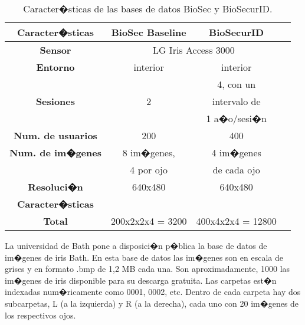 \vspace{1cm}

\begin{table}[h]
    \centering
    \scriptsize
    \begin{tabular}{|c|c|c|c|}
        \hline
        \textbf{Caracter�sticas}   & \textbf{BioSec Baseline}      &  \textbf{BioSecurID}       \\
        \hline
        \textbf{Sensor}            & \multicolumn{2}{|c|}{LG Iris Access 3000}\\
        \hline
        \textbf{Entorno}           & interior               & interior        \\
        \hline
                                   &                        & 4, con un                \\
        \textbf{Sesiones}          & 2                      & intervalo de               \\
                                   &                        & 1 a�o/sesi�n           \\
        \hline
        \textbf{Num. de usuarios}  & 200                    & 400              \\
        \hline
        \textbf{Num. de im�genes}  & 8 im�genes,            & 4 im�genes  \\
                                   & 4 por ojo              & de cada ojo \\
        \hline
        \textbf{Resoluci�n}        & 640x480                & 640x480         \\
        \hline
        \textbf{Caracter�sticas}   &                        &                 \\
        \hline
        \textbf{Total}             & 200x2x2x4 = 3200       & 400x4x2x4 = 12800    \\
        \hline
    \end{tabular}
    \caption{Caracter�sticas de las bases de datos BioSec\citet{database:Biosec} y BioSecurID\citet{database:BiosecurID}.}
    \label{table:info_ATVS}
\end{table}

\newpage

 \label{sec:BATH_database}

La universidad de Bath pone a disposici�n p�blica la base de datos de im�genes de iris Bath. En esta base de datos las im�genes son en escala de grises y en formato .bmp de 1,2 MB cada una. Son aproximadamente, 1000 las im�genes de iris disponible para su descarga gratuita. Las carpetas est�n indexadas num�ricamente como 0001, 0002, etc. Dentro de cada carpeta hay dos subcarpetas, L (a la izquierda) y R (a la derecha), cada uno con 20 im�genes de los respectivos ojos.

